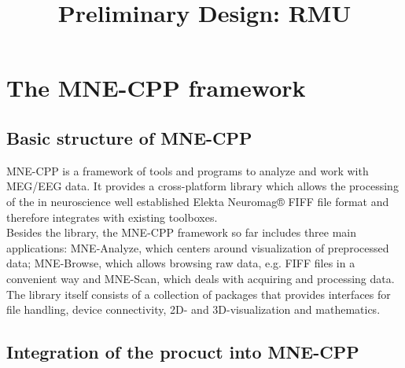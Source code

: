 \documentclass[a4paper, 11pt, english, fleqn]{article}
\begin{document}
	
\title{Preliminary Design: RMU}
\vspace{3 in}
\maketitle
\clearpage

\tableofcontents

\clearpage
\section{The MNE-CPP framework}

\subsection{Basic structure of MNE-CPP}

MNE-CPP is a framework of tools and programs to analyze and work with MEG/EEG data.
It provides a cross-platform library which allows the processing of the in neuroscience well established Elekta Neuromag® FIFF file format and therefore integrates with existing toolboxes. \\
Besides the library, the MNE-CPP framework so far includes three main applications: MNE-Analyze, which centers around visualization of preprocessed data; MNE-Browse, which allows browsing raw data, e.g. FIFF files in a convenient way and MNE-Scan, which deals with acquiring and processing data. \\
The library itself consists of a collection of packages that provides interfaces for file handling, device connectivity, 2D- and 3D-visualization and mathematics.

\subsection{Integration of the procuct into MNE-CPP}
\end{document}
